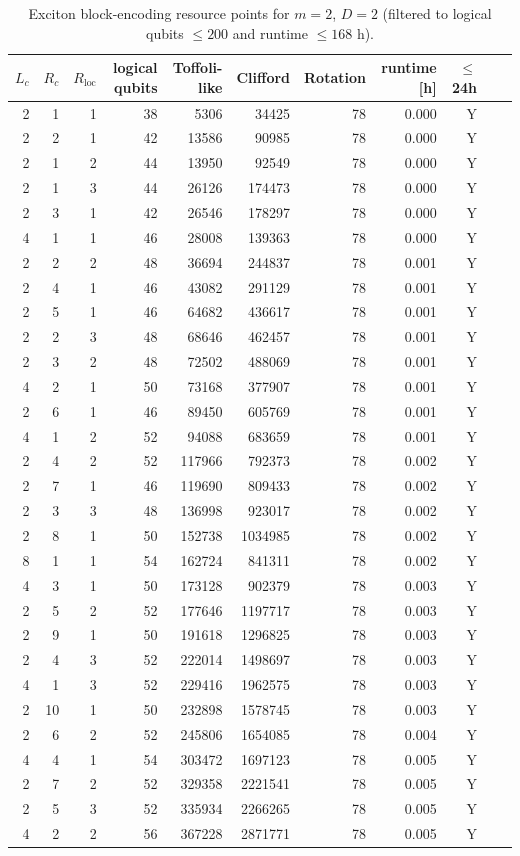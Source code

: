 \begin{table}[t]
\centering
\scriptsize
\caption{Exciton block-encoding resource points for $m=2$, $D=2$ (filtered to logical qubits $\leq 200$ and runtime $\leq 168$ h).}
\begin{tabularx}{\linewidth}{rrrrrrrrrrr}
\toprule
$L_c$ & $R_c$ & $R_{\mathrm{loc}}$ & logical qubits & Toffoli-like & Clifford & Rotation & runtime [h] & $\leq$ 24h \\
\midrule
2 & 1 & 1 & 38 & 5306 & 34425 & 78 & 0.000 & Y \\
2 & 2 & 1 & 42 & 13586 & 90985 & 78 & 0.000 & Y \\
2 & 1 & 2 & 44 & 13950 & 92549 & 78 & 0.000 & Y \\
2 & 1 & 3 & 44 & 26126 & 174473 & 78 & 0.000 & Y \\
2 & 3 & 1 & 42 & 26546 & 178297 & 78 & 0.000 & Y \\
4 & 1 & 1 & 46 & 28008 & 139363 & 78 & 0.000 & Y \\
2 & 2 & 2 & 48 & 36694 & 244837 & 78 & 0.001 & Y \\
2 & 4 & 1 & 46 & 43082 & 291129 & 78 & 0.001 & Y \\
2 & 5 & 1 & 46 & 64682 & 436617 & 78 & 0.001 & Y \\
2 & 2 & 3 & 48 & 68646 & 462457 & 78 & 0.001 & Y \\
2 & 3 & 2 & 48 & 72502 & 488069 & 78 & 0.001 & Y \\
4 & 2 & 1 & 50 & 73168 & 377907 & 78 & 0.001 & Y \\
2 & 6 & 1 & 46 & 89450 & 605769 & 78 & 0.001 & Y \\
4 & 1 & 2 & 52 & 94088 & 683659 & 78 & 0.001 & Y \\
2 & 4 & 2 & 52 & 117966 & 792373 & 78 & 0.002 & Y \\
2 & 7 & 1 & 46 & 119690 & 809433 & 78 & 0.002 & Y \\
2 & 3 & 3 & 48 & 136998 & 923017 & 78 & 0.002 & Y \\
2 & 8 & 1 & 50 & 152738 & 1034985 & 78 & 0.002 & Y \\
8 & 1 & 1 & 54 & 162724 & 841311 & 78 & 0.002 & Y \\
4 & 3 & 1 & 50 & 173128 & 902379 & 78 & 0.003 & Y \\
2 & 5 & 2 & 52 & 177646 & 1197717 & 78 & 0.003 & Y \\
2 & 9 & 1 & 50 & 191618 & 1296825 & 78 & 0.003 & Y \\
2 & 4 & 3 & 52 & 222014 & 1498697 & 78 & 0.003 & Y \\
4 & 1 & 3 & 52 & 229416 & 1962575 & 78 & 0.003 & Y \\
2 & 10 & 1 & 50 & 232898 & 1578745 & 78 & 0.003 & Y \\
2 & 6 & 2 & 52 & 245806 & 1654085 & 78 & 0.004 & Y \\
4 & 4 & 1 & 54 & 303472 & 1697123 & 78 & 0.005 & Y \\
2 & 7 & 2 & 52 & 329358 & 2221541 & 78 & 0.005 & Y \\
2 & 5 & 3 & 52 & 335934 & 2266265 & 78 & 0.005 & Y \\
4 & 2 & 2 & 56 & 367228 & 2871771 & 78 & 0.005 & Y \\
\bottomrule
\end{tabularx}
\end{table}
